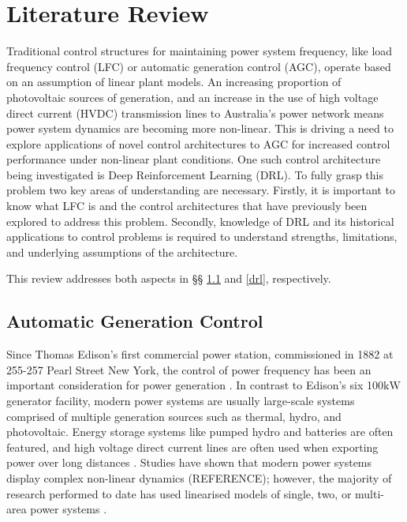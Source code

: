 \section{Literature Review}
Traditional control structures for maintaining power system frequency, like load frequency control (LFC) or automatic generation control (AGC), operate based on an assumption of linear plant models. An increasing proportion of photovoltaic sources of generation, and an increase in the use of high voltage direct current (HVDC) transmission lines to Australia's power network means power system dynamics are becoming more non-linear. This is driving a need to explore applications of novel control architectures to AGC for increased control performance under non-linear plant conditions. One such control architecture being investigated is Deep Reinforcement Learning (DRL). To fully grasp this problem two key areas of understanding are necessary. Firstly, it is important to know what LFC is and the control architectures that have previously been explored to address this problem. Secondly, knowledge of DRL and its historical applications to control problems is required to understand strengths, limitations, and underlying assumptions of the architecture.

This review addresses both aspects in \S{}\S{} \ref{agc} and \ref{drl}, respectively.


\subsection{Automatic Generation Control}\label{agc}
Since Thomas Edison's first commercial power station, commissioned in 1882 at 255-257 Pearl Street New York, the control of power frequency has been an important consideration for power generation \cite{Cohn1983}. In contrast to Edison's six 100$\si{\kilo\watt}$ generator facility, modern power systems are usually large-scale systems comprised of multiple generation sources such as thermal, hydro, and photovoltaic. Energy storage systems like pumped hydro and batteries are often featured, and high voltage direct current lines are often used when exporting power over long distances \cite{Bevrani2011, Glover2012, Kothari2011, Kundur1994}. Studies have shown that modern power systems display complex non-linear dynamics (REFERENCE); however, the majority of research performed to date has used linearised models of single, two, or multi-area power systems \cite{Kothari2011, Saadat2011, Cohn1956, Bevrani2011, Wood2013, Elgerd1970, Kwatny1975}.

